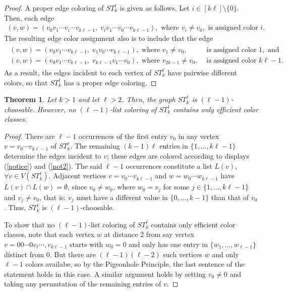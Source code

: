 \documentclass[10pt,a4paper]{amsart}
\newtheorem{theorem}{Theorem}
\begin{document}
\begin{proof}
A proper edge coloring of $ST_k^\ell$ is given as follows. Let $i\in[k\ell]\setminus\{0\}$. Then, 
each edge 
\begin{eqnarray}\label{notice}
(v,w)=(v_0v_1\cdots v_i\cdots v_{k\ell-1},\;v_iv_1\cdots v_0\cdots v_{k\ell-1}),
\mbox{ where }v_i\ne v_0,
\mbox{ is assigned color }i.
\end{eqnarray} 
The resulting edge color assignment also is to include that the edge
\begin{eqnarray}\label{not2}\begin{array}{ll}
(v,w)=(v_0v_1\cdots v_{k\ell-1},\;v_1v_0\cdots v_{k\ell-1}),\mbox{ where }v_1\ne v_0,&\mbox{ is assigned color }1,\mbox{ and}\\
(v,w)=(v_0v_1\cdots v_{k\ell-1},\;v_{k\ell-1}v_1\cdots v_{0}),\mbox{ where }v_{2k-1}\ne v_0,&\mbox{ is assigned color }k\ell-1.
\end{array}\end{eqnarray} 
As a result, the edges incident to each vertex of $ST_k^\ell$ have pairwise different colors, so that $ST_k^\ell$ has a proper edge coloring.
\end{proof}

\begin{theorem}\label{choo}
Let $k>1$ and let $\ell>2$. Then, the graph $ST_k^\ell$ is $(\ell-1)$-choosable. However, no $(\ell-1)$-list coloring of $ST_k^\ell$ contains only efficient color classes.
\end{theorem}

\begin{proof}
There are $\ell-1$ occurrences of the first entry $v_0$ in any vertex $v=v_0\cdots v_{k\ell-1}$ of $ST_k^\ell$. The remaining $(k-1)\ell$ entries in $\{1,\ldots,k\ell-1\}$ determine the edges incident to $v$; these edges are colored according to displays (\ref{notice}) and (\ref{not2}). The said $\ell-1$ occurrences constitute a list $L(v)$, $\forall v\in V(ST_k^\ell)$. Adjacent vertices $v=v_0\cdots v_{k\ell-1}$ and $w=w_0\cdots w_{k\ell-1}$ have $L(v)\cap L(w)=\emptyset$, since $v_0\neq w_0$, where $w_0=v_j$ for some $j\in\{1,\dots,k\ell-1\}$ and $v_j\neq v_0$, that is: $v_j$ must have a different value in $\{0,\ldots,k-1\}$ than that of $v_0$. Thus, $ST_k^\ell$ is $(\ell-1)$-choosable.

To show that no $(\ell-1)$-list coloring of $ST_k^\ell$ contains only efficient color classes, note that each vertex $w$ at distance 2 from say vertex $v=00\cdots 0v_\ell\cdots,v_{k\ell-1}$
starts with $w_0=0$ and only has one entry in $\{w_1,\ldots,w_{\ell-1}\}$ distinct from 0. But there are $(\ell-1)(\ell-2)$ such vertices $w$ and only $\ell-1$ colors availabe, so by the Pigeonhole Principle, the last sentence of the statement holds in this case. A similar argument holds by setting $v_0\ne 0$ and taking any permutation of the remaining entries of $v$.
\end{proof}
\end{document}
